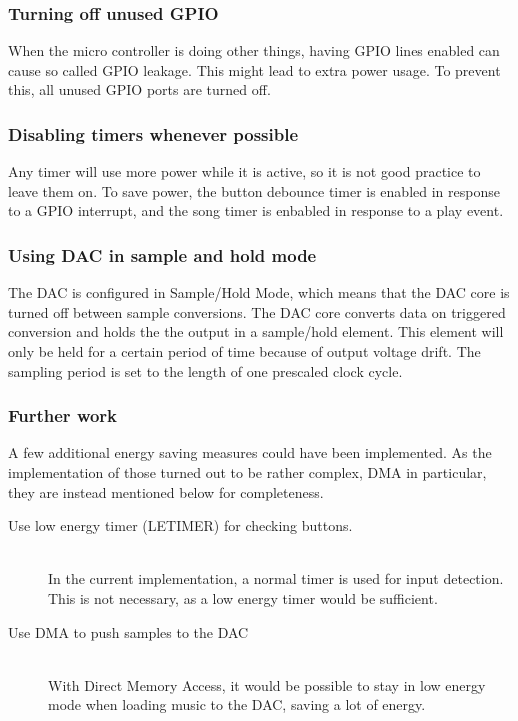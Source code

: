 \subsubsection{Turning off unused GPIO}
When the micro controller is doing other things, having GPIO lines enabled can cause so called GPIO leakage.
This might lead to extra power usage.
To prevent this, all unused GPIO ports are turned off.

\subsubsection{Disabling timers whenever possible}
Any timer will use more power while it is active, so it is not good practice to leave them on.
To save power, the button debounce timer is enabled in response to a GPIO interrupt, and the song timer is enbabled in response to a play event. 

\subsubsection{Using DAC in sample and hold mode}
The DAC is configured in Sample/Hold Mode, which means that the DAC core is turned off between sample conversions.
The DAC core converts data on triggered conversion and holds the the output in a sample/hold element.
This element will only be held for a certain period of time because of output voltage drift.
The sampling period is set to the length of one prescaled clock cycle.

\subsubsection{Further work}
A few additional energy saving measures could have been implemented.
As the implementation of those turned out to be rather complex, DMA in particular, they are instead mentioned below for completeness.

\begin{description}
  \item[Use low energy timer (LETIMER) for checking buttons.] \hfill \\
        In the current implementation, a normal timer is used for input detection. This is not necessary, as a low energy timer would be sufficient. 
  \item[Use DMA to push samples to the DAC] \hfill \\ \label{DMA} 
        With Direct Memory Access, it would be possible to stay in low energy mode when loading music to the DAC, saving a lot of energy.
\end{description}



